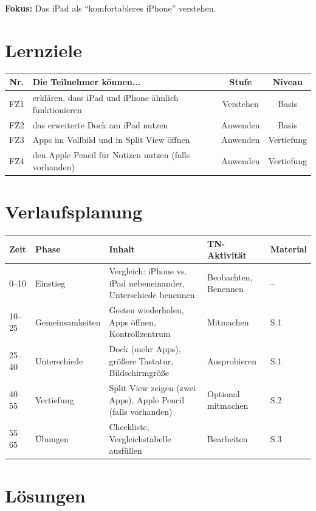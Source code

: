 \documentclass[11pt,a4paper]{article}
\begin{document}
\textbf{Fokus:} Das iPad als ``komfortableres iPhone'' verstehen.

\section{Lernziele}

\begin{tabular}{|c|p{7cm}|c|c|}
\hline
\textbf{Nr.} & \textbf{Die Teilnehmer können...} & \textbf{Stufe} & \textbf{Niveau} \\
\hline
FZ1 & erklären, dass iPad und iPhone ähnlich funktionieren & Verstehen & Basis \\
FZ2 & das erweiterte Dock am iPad nutzen & Anwenden & Basis \\
FZ3 & Apps im Vollbild und in Split View öffnen & Anwenden & Vertiefung \\
FZ4 & den Apple Pencil für Notizen nutzen (falls vorhanden) & Anwenden & Vertiefung \\
\hline
\end{tabular}

\section{Verlaufsplanung}

\begin{longtable}{|p{1cm}|p{2cm}|p{5cm}|p{3cm}|p{2cm}|}
\hline
\textbf{Zeit} & \textbf{Phase} & \textbf{Inhalt} & \textbf{TN-Aktivität} & \textbf{Material} \\
\hline
0--10 & Einstieg & Vergleich: iPhone vs. iPad nebeneinander, Unterschiede benennen & Beobachten, Benennen & -- \\
\hline
10--25 & Gemeinsamkeiten & Gesten wiederholen, Apps öffnen, Kontrollzentrum & Mitmachen & S.1 \\
\hline
25--40 & Unterschiede & Dock (mehr Apps), größere Tastatur, Bildschirmgröße & Ausprobieren & S.1 \\
\hline
40--55 & Vertiefung & Split View zeigen (zwei Apps), Apple Pencil (falls vorhanden) & Optional mitmachen & S.2 \\
\hline
55--65 & Übungen & Checkliste, Vergleichstabelle ausfüllen & Bearbeiten & S.3 \\
\hline
\end{longtable}

\section{Lösungen}
\end{document}
